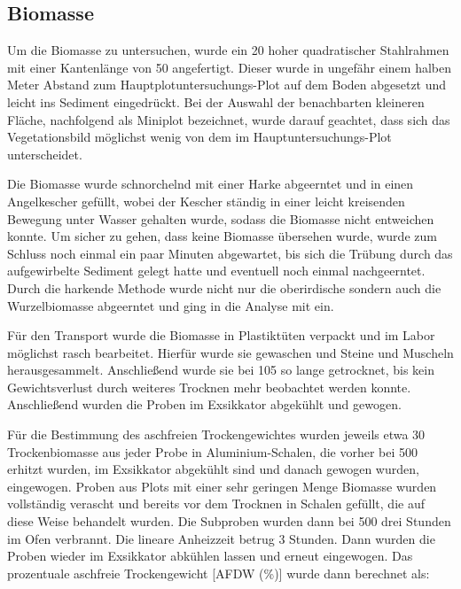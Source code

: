 \subsection{Biomasse} 


Um die Biomasse zu untersuchen, wurde ein \unit{20}{\centi\metre} hoher quadratischer Stahlrahmen mit einer Kantenlänge von \unit{50}{\centi\metre} angefertigt. Dieser wurde in ungefähr einem halben Meter Abstand zum Hauptplotuntersuchungs-Plot auf dem Boden abgesetzt und leicht ins Sediment eingedrückt. Bei der Auswahl der benachbarten kleineren Fläche, nachfolgend als Miniplot bezeichnet, wurde darauf geachtet, dass sich das Vegetationsbild  möglichst wenig von dem im Hauptuntersuchungs-Plot unterscheidet.

Die Biomasse wurde schnorchelnd mit einer Harke abgeerntet und in einen Angelkescher gefüllt, wobei der Kescher ständig in einer leicht kreisenden Bewegung unter Wasser gehalten wurde, sodass die Biomasse nicht entweichen konnte. Um sicher zu gehen, dass keine Biomasse übersehen wurde, wurde zum Schluss noch einmal ein paar Minuten abgewartet, bis sich die Trübung durch das aufgewirbelte Sediment gelegt hatte und eventuell noch einmal nachgeerntet. Durch die harkende Methode wurde nicht nur die oberirdische sondern auch die Wurzelbiomasse abgeerntet und ging in die Analyse mit ein.

Für den Transport wurde die Biomasse in Plastiktüten verpackt und im Labor möglichst rasch bearbeitet. Hierfür wurde sie gewaschen und Steine und Muscheln herausgesammelt. Anschließend wurde sie bei \unit{105}{\celsius} so lange getrocknet, bis kein Gewichtsverlust durch weiteres Trocknen mehr beobachtet werden konnte. Anschließend wurden die Proben im Exsikkator abgekühlt und gewogen.

Für die Bestimmung des aschfreien Trockengewichtes wurden jeweils etwa \unit{30}{\gram} Trockenbiomasse aus jeder Probe in  Aluminium-Schalen, die vorher bei \unit{500}{\celsius} erhitzt wurden, im Exsikkator abgekühlt sind und danach gewogen wurden, eingewogen. Proben aus Plots mit einer sehr geringen Menge Biomasse wurden vollständig verascht und bereits vor dem Trocknen in Schalen gefüllt, die auf diese Weise behandelt wurden. Die Subproben wurden dann bei \unit{500}{\celsius} drei Stunden im Ofen verbrannt. Die lineare Anheizzeit betrug 3 Stunden. Dann wurden die Proben wieder im Exsikkator abkühlen lassen und erneut eingewogen. Das prozentuale aschfreie Trockengewicht [AFDW (\%)] wurde dann berechnet als:

